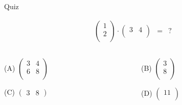\documentclass[german]{beamer}
\newcommand{\bq}{\begin{eqnarray*}}
\newcommand{\eq}{\end{eqnarray*}}
\begin{document}
\begin{frame}{Quiz}

\bq
\left( \begin{array}{cc}
 1 \\
 2 \\
\end{array} \right)
 \cdot
\left( \begin{array}{cc}
 3 & 4 \\
\end{array} \right)
 & = & ?
\eq
\begin{columns}[b]
\begin{column}{5cm}
\begin{description}
\item{(A)} $\left( \begin{array}{cc} 3 & 4 \\ 6 & 8 \\ \end{array} \right)$
\item{(C)} $\left( \begin{array}{cc} 3 & 8 \end{array} \right)$
\end{description}
\end{column}
\begin{column}{5cm}
\begin{description}
\item{(B)} $\left( \begin{array}{c} 3 \\ 8 \\ \end{array} \right)$
\item{(D)} $\left( \begin{array}{c} 11 \\ \end{array} \right)$
\end{description}
\end{column}
\end{columns}

\end{frame}
\end{document}
